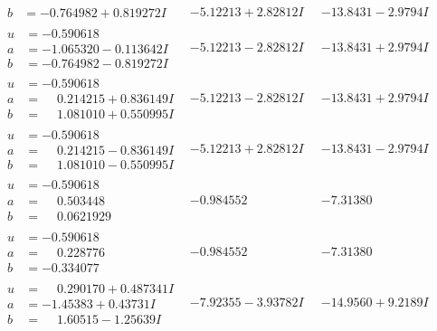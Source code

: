 \documentclass[1p]{elsarticle_modified}
\theoremstyle{definition}
\begin{document}
$$\begin{array}{c|c|c}
\begin{aligned}
b &= -0.764982 + 0.819272 I\end{aligned}
 & -5.12213 + 2.82812 I & -13.8431 - 2.9794 I \\ \hline\begin{aligned}
u &= -0.590618\phantom{ +0.000000I} \\
a &= -1.065320 - 0.113642 I \\
b &= -0.764982 - 0.819272 I\end{aligned}
 & -5.12213 - 2.82812 I & -13.8431 + 2.9794 I \\ \hline\begin{aligned}
u &= -0.590618\phantom{ +0.000000I} \\
a &= \phantom{-}0.214215 + 0.836149 I \\
b &= \phantom{-}1.081010 + 0.550995 I\end{aligned}
 & -5.12213 - 2.82812 I & -13.8431 + 2.9794 I \\ \hline\begin{aligned}
u &= -0.590618\phantom{ +0.000000I} \\
a &= \phantom{-}0.214215 - 0.836149 I \\
b &= \phantom{-}1.081010 - 0.550995 I\end{aligned}
 & -5.12213 + 2.82812 I & -13.8431 - 2.9794 I \\ \hline\begin{aligned}
u &= -0.590618\phantom{ +0.000000I} \\
a &= \phantom{-}0.503448\phantom{ +0.000000I} \\
b &= \phantom{-}0.0621929\phantom{ +0.000000I}\end{aligned}
 & -0.984552\phantom{ +0.000000I} & -7.31380\phantom{ +0.000000I} \\ \hline\begin{aligned}
u &= -0.590618\phantom{ +0.000000I} \\
a &= \phantom{-}0.228776\phantom{ +0.000000I} \\
b &= -0.334077\phantom{ +0.000000I}\end{aligned}
 & -0.984552\phantom{ +0.000000I} & -7.31380\phantom{ +0.000000I} \\ \hline\begin{aligned}
u &= \phantom{-}0.290170 + 0.487341 I \\
a &= -1.45383 + 0.43731 I \\
b &= \phantom{-}1.60515 - 1.25639 I\end{aligned}
 & -7.92355 - 3.93782 I & -14.9560 + 9.2189 I \\ \hline\begin{aligned}

\end{aligned}
\end{array}$$
\end{document}

